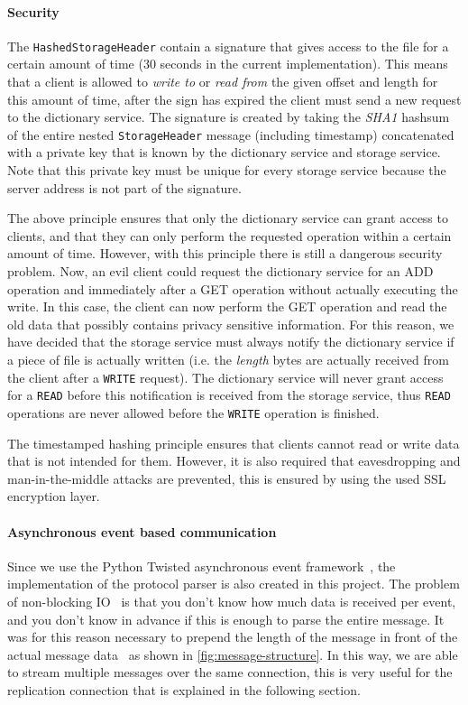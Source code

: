 \documentclass[12pt,a4paper]{scrartcl}
\begin{document}
\paragraph{Security}
The \verb|HashedStorageHeader| contain a signature that gives access to the file for a certain amount of time (30 seconds in the current implementation). This means that a client is allowed to \emph{write to} or \emph{read from} the given offset and length for this amount of time, after the sign has expired the client must send a new request to the dictionary service. The signature is created by taking the \emph{SHA1} hashsum of the entire nested \verb|StorageHeader| message (including timestamp) concatenated with a private key that is known by the dictionary service and storage service. Note that this private key must be unique for every storage service because the server address is not part of the signature.

The above principle ensures that only the dictionary service can grant access to clients, and that they can only perform the requested operation within a certain amount of time. However, with this principle there is still a dangerous security problem. Now, an evil client could request the dictionary service for an ADD operation and immediately after a GET operation without actually executing the write. In this case, the client can now perform the GET operation and read the old data that possibly contains privacy sensitive information.
For this reason, we have decided that the storage service must always notify the dictionary service if a piece of file is actually written (i.e. the \emph{length} bytes are actually received from the client after a \verb|WRITE| request). The dictionary service will never grant access for a \verb|READ| before this notification is received from the storage service, thus \verb|READ| operations are never allowed before the \verb|WRITE| operation is finished.

The timestamped hashing principle ensures that clients cannot read or write data that is not intended for them. However, it is also required that eavesdropping and man-in-the-middle attacks are prevented, this is ensured by using the used SSL encryption layer.

\paragraph{Asynchronous event based communication}
Since we use the Python Twisted asynchronous event framework~\cite{twisted}, the implementation of the protocol parser is also created in this project. The problem of non-blocking IO~\cite{wiki-nonblocking-io} is that you don't know how much data is received per event, and you don't know in advance if this is enough to parse the entire message. It was for this reason necessary to prepend the length of the message in front of the actual message data~\cite{gpb-stream} as shown in \autoref{fig:message-structure}.
In this way, we are able to stream multiple messages over the same connection, this is very useful for the replication connection that is explained in the following section.
\end{document}

